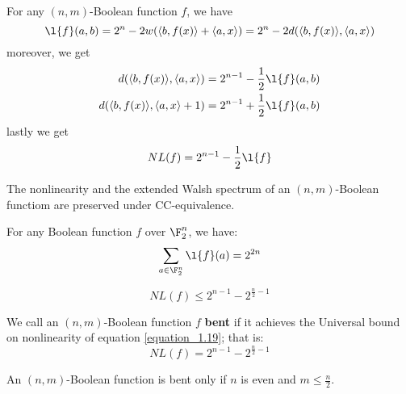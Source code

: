 \begin{proposition}\label{proposition_1.1.4}
  For any $(n,m)$-Boolean function $f$, we have
  \begin{equation}\label{equation_1.14}
    \l{f}(a,b)=2^n-2w(\langle b,f(x) \rangle+\langle a,x \rangle)=
    2^n-2d(\langle b,f(x) \rangle, \langle a,x \rangle)
  \end{equation}
  moreover, we get
  \begin{align}
    d(\langle b,f(x) \rangle, \langle a,x \rangle) &=  2^{n-1}-\frac{1}{2}\l{f}(a,b) \\
    d(\langle b,f(x) \rangle, \langle a,x \rangle+1) &=  2^{n-1}+\frac{1}{2}\l{f}(a,b)
  \end{align}
  lastly we get
  \begin{equation}\label{equation_1.17}
    NL(f)=2^{n-1}-\frac{1}{2}\l{f}
  \end{equation}
\end{proposition}
\begin{corollary}
  The nonlinearity and the extended Walsh spectrum of an $(n,m)$-Boolean
  functiom are preserved under CC-equivalence.
\end{corollary}

\begin{proposition}\label{proposition_1.1.5}
  For any Boolean function $f$ over  $\F_2^n$, we have:
  \begin{equation}\label{equation_1.18}
    \sum_{a \in \F_2^n}{\l{f}(a)}=2^{2n}
  \end{equation}
\end{proposition}
\begin{corollary}
  \begin{equation}\label{equation_1.19}
    NL(f) \leq 2^{n-1}-2^{\frac{n}{2}-1}
  \end{equation}
\end{corollary}

\begin{definition}
  We call an $(n,m)$-Boolean function $f$ \textbf{bent} if it achieves the
  Universal bound on nonlinearity of equation \ref{equation_1.19}; that is:
  \begin{equation*}
    NL(f)=2^{n-1}-2^{\frac{n}{2}-1}
  \end{equation*}
\end{definition}

\begin{theorem}\label{theorem_1.2.6}
  An $(n,m)$-Boolean function is bent only if $n$ is even and  $m \leq
  \frac{n}{2}$.
\end{theorem}

